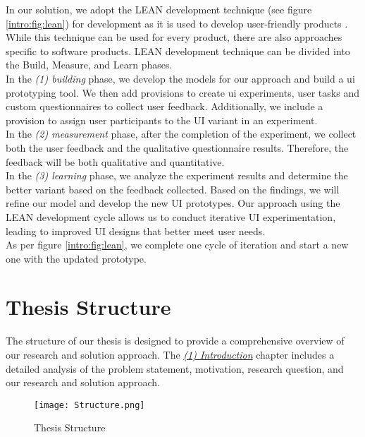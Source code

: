 In our solution, we adopt the LEAN development technique (see figure \ref{intro:fig:lean}) for development as it is used to develop user-friendly products \cite{article:lean:hart}.
While this technique can be used for every product, there are also approaches specific to software products.
LEAN development technique can be divided into the Build, Measure, and Learn phases. \\
In the \textit{(1) building} phase, we develop the models for our approach and build a \ac{ui} prototyping tool. 
We then add provisions to create \ac{ui} experiments, user tasks and custom questionnaires to collect user feedback. 
Additionally, we include a provision to assign user participants to the UI variant in an experiment. \\
In the \textit{(2) measurement} phase, after the completion of the experiment, we collect both the user feedback and the qualitative questionnaire results.
Therefore, the feedback will be both qualitative and quantitative.\\
In the \textit{(3) learning} phase, we analyze the experiment results and determine the better variant based on the feedback collected. 
Based on the findings, we will refine our model and develop the new UI prototypes. 
Our approach using the LEAN development cycle allows us to conduct iterative UI experimentation, leading to improved UI designs that better meet user needs. \\
As per figure \ref{intro:fig:lean}, we complete one cycle of iteration and start a new one with the updated prototype.

\clearpage

\section{Thesis Structure}
\label{introduction:section:structure}
The structure of our thesis is designed to provide a comprehensive overview of our research and solution approach.
The \textit{\hyperref[chap:introduction]{(1) Introduction}} chapter includes a detailed analysis of the problem statement, motivation, research question, and our research and solution approach.

\begin{figure}[htbp!]
    \centering
    \texttt{[image: Structure.png]}
    \caption{Thesis Structure}
    \label{intro:fig:structure}
\end{figure}

